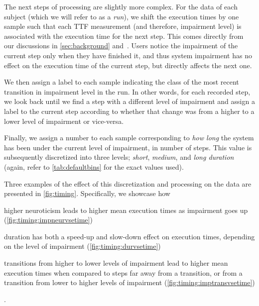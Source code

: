 The next steps of processing are slightly more complex.
For the data of each subject (which we will refer to as a \emph{run}), we shift the execution times by one sample such that each \gls{TTF} measurement (and therefore, impairment level) is associated with the execution time for the next step.
This comes directly from our discussions in \cref{sec:background} and~\cite{olguinmunoz:impact2021}.
Users notice the impairment of the current step only when they have finished it, and thus system impairment has no effect on the execution time of the current step, but directly affects the next one.

We then assign a label to each sample indicating the class of the most recent transition in impairment level in the run.
In other words, for each recorded step, we look back until we find a step with a different level of impairment and assign a label to the current step according to whether that change was from a higher to a lower level of impairment or vice-versa.

Finally, we assign a number to each sample corresponding to \emph{how long} the system has been under the current level of impairment, in number of steps.
This value is subsequently discretized into three levels; \emph{short}, \emph{medium}, and \emph{long duration} (again, refer to \cref{tab:defaultbins} for the exact values used).

Three examples of the effect of this discretization and processing on the data are presented in \cref{fig:timing}.
Specifically, we showcase how
\begin{inlineenum}
    \item higher neuroticism leads to higher mean execution times as impairment goes up (\cref{fig:timing:impneurvsetime})
    \item duration has both a speed-up and slow-down effect on execution times, depending on the level of impairment (\cref{fig:timing:durvsetime})
    \item transitions from higher to lower levels of impairment lead to higher mean execution times when compared to steps far away from a transition, or from a transition from lower to higher levels of impairment (\cref{fig:timing:imptransvsetime})
\end{inlineenum}.


